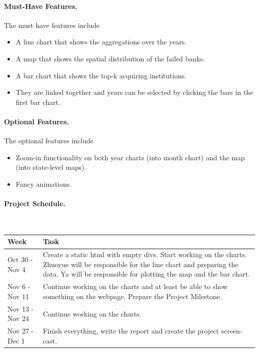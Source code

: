 \documentclass[11pt]{article}
\begin{document}
\paragraph{Must-Have Features.} The must have features include

\begin{itemize}
    \item A line chart that shows the aggregations over the years.

    \item A map that shows the spatial distribution of the failed banks.

    \item A bar chart that shows the top-k acquiring institutions.

    \item They are linked together and years can be selected by clicking the
        bars in the first bar chart.
\end{itemize}

\paragraph{Optional Features.} The optional features include

\begin{itemize}
    \item Zoom-in functionality on both year charts (into month chart)
         and the map (into state-level maps).

     \item Fancy animations.
\end{itemize}

\paragraph{Project Schedule.} $\quad$

\begin{center}
\begin{tabular}{l|p{10cm}}
    \hline
    Week & Task \\\hline
    Oct 30 - Nov 4 & Create a static html with empty divs. Start working on
    the charts. Zhuoyue will be responsible for the line chart and preparing
    the data. Ya will be responsible for plotting the map and the bar chart.
    \\\hline 
    Nov 6 - Nov 11 & Continue working on the charts and at least be able to
    show something on the webpage. Prepare the Project Milestone.\\\hline
    Nov 13 - Nov 24 & Continue working on the charts. \\\hline
    Nov 27 - Dec 1 & Finish everything, write the report and create the project
    screen-cast. \\\hline
\end{tabular}
\end{center}
\end{document}
